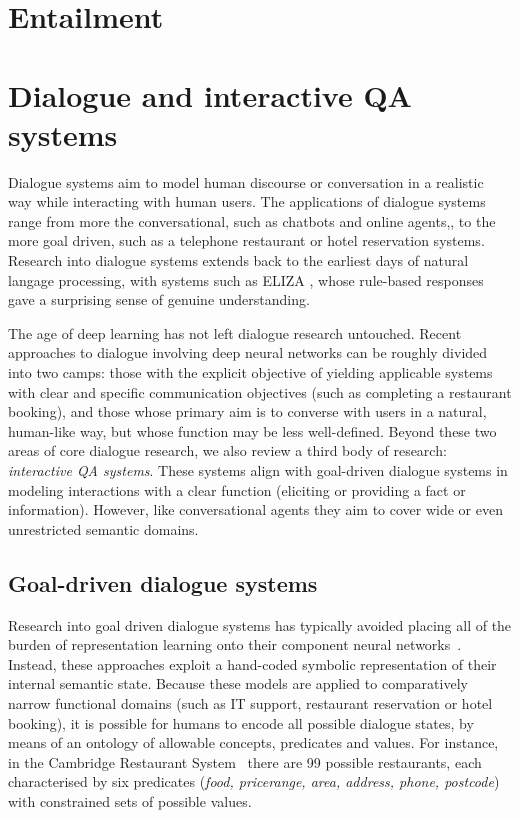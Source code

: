 \documentclass[11pt,letterpaper]{article}
\begin{document}
\section{Entailment}

\section{Dialogue and interactive QA systems}

Dialogue systems aim to model human discourse or conversation in a realistic way while interacting with human users. The applications of dialogue systems range from more the conversational, such as chatbots and online agents,, to the more goal driven, such as a telephone restaurant or hotel reservation systems. Research into dialogue systems extends back to the earliest days of natural langage processing, with systems such as ELIZA \cite{weizenbaum1966eliza}, whose rule-based responses gave a surprising sense of genuine understanding.     

The age of deep learning has not left dialogue research untouched. Recent approaches to dialogue involving deep neural networks can be roughly divided into two camps: those with the explicit objective of yielding applicable systems with clear and specific communication objectives (such as completing a restaurant booking), and those whose primary aim is to converse with users in a natural, human-like way, but whose function may be less well-defined. Beyond these two areas of core dialogue research, we also review a third body of research: \emph{interactive QA systems}. These systems align with goal-driven dialogue systems in modeling interactions with a clear function (eliciting or providing a fact or information). However, like conversational agents they aim to cover wide or even unrestricted semantic domains.     

\subsection{Goal-driven dialogue systems}
Research into goal driven dialogue systems has typically avoided placing all of the burden of representation learning onto their component neural networks~\cite{henderson2014word,mrkvsic2015multi,wen2015stochastic,wen2015semantically}. Instead, these approaches exploit a hand-coded symbolic representation of their internal semantic state. Because these models are applied to comparatively narrow functional domains (such as IT support, restaurant reservation or hotel booking), it is possible for humans to encode all possible dialogue states, by means of an ontology of allowable concepts, predicates and values. For instance, in the Cambridge Restaurant System~\cite{wen2016network} there are 99 possible restaurants, each characterised by six predicates (\emph{food, pricerange, area, address, phone, postcode}) with constrained sets of possible values. 
\end{document}
